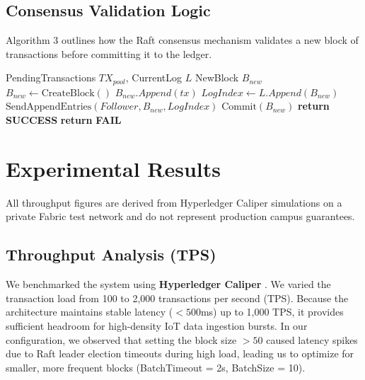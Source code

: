 \documentclass[conference]{IEEEtran}
\renewcommand{\RETURN}{\STATE \textbf{return} }
\begin{document}
\subsection{Consensus Validation Logic}
Algorithm 3 outlines how the Raft consensus mechanism validates a new block of transactions before committing it to the ledger.

\begin{algorithm}[H]
\caption{Raft Consensus Validation (Leader Node)}
\begin{algorithmic}[1]
\REQUIRE PendingTransactions $TX_{pool}$, CurrentLog $L$
\ENSURE NewBlock $B_{new}$
\STATE $B_{new} \leftarrow \text{CreateBlock}()$
        \STATE $B_{new}.Append(tx)$
    \ENDIF
\ENDFOR
\STATE $LogIndex \leftarrow L.Append(B_{new})$
    \STATE $\text{SendAppendEntries}(Follower, B_{new}, LogIndex)$
\ENDFOR
{}
    \STATE $\text{Commit}(B_{new})$
    \RETURN \textbf{SUCCESS}
\ELSE
    \RETURN \textbf{FAIL}
\ENDIF
\end{algorithmic}
\end{algorithm}

\section{Experimental Results}
All throughput figures are derived from Hyperledger Caliper simulations on a private Fabric test network and do not represent production campus guarantees.

\subsection{Throughput Analysis (TPS)}
We benchmarked the system using \textbf{Hyperledger Caliper} \cite{b22}. We varied the transaction load from 100 to 2,000 transactions per second (TPS). Because the architecture maintains stable latency ($<500$ms) up to 1,000 TPS, it provides sufficient headroom for high-density IoT data ingestion bursts. In our configuration, we observed that setting the block size $>50$ caused latency spikes due to Raft leader election timeouts during high load, leading us to optimize for smaller, more frequent blocks (BatchTimeout = 2s, BatchSize = 10).
\end{document}
